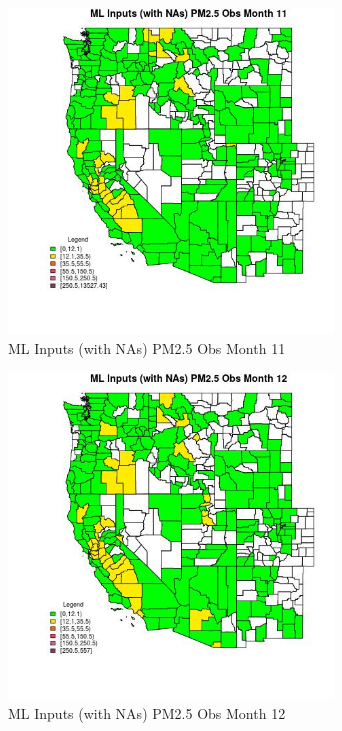 \clearpage 

\begin{figure} 
\centering  
\includegraphics[width=0.77\textwidth]{Code_Outputs/Report_ML_input_PM25_Step4_part_f_de_duplicated_aves_prioritize_24hr_obswNAs_CountyPM25_ObsmedianMonth11.jpg} 
\caption{\label{fig:Report_ML_input_PM25_Step4_part_f_de_duplicated_aves_prioritize_24hr_obswNAsCountyPM25_ObsmedianMonth11}ML Inputs (with NAs) PM2.5 Obs Month 11} 
\end{figure} 
 

\begin{figure} 
\centering  
\includegraphics[width=0.77\textwidth]{Code_Outputs/Report_ML_input_PM25_Step4_part_f_de_duplicated_aves_prioritize_24hr_obswNAs_CountyPM25_ObsmedianMonth12.jpg} 
\caption{\label{fig:Report_ML_input_PM25_Step4_part_f_de_duplicated_aves_prioritize_24hr_obswNAsCountyPM25_ObsmedianMonth12}ML Inputs (with NAs) PM2.5 Obs Month 12} 
\end{figure} 
 

